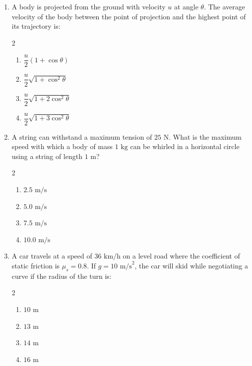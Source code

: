 \documentclass[11pt,a4paper]{article}
\begin{document}
\begin{enumerate}[label=\textbf{\textcolor{l2Amber}{Q\arabic*.}},leftmargin=24pt,itemsep=10pt,start=26]
  \item A body is projected from the ground with velocity $u$ at angle $\theta$. The average velocity of the body between the point of projection and the highest point of its trajectory is:
  \begin{multicols}{2}
  \begin{enumerate}[label=\textbf{\textcolor{primaryDark}{(\Alph*)}},itemsep=2pt]
    \item $\dfrac{u}{2}(1 + \cos\theta)$
    \item $\dfrac{u}{2}\sqrt{1 + \cos^2\theta}$
    \item $\dfrac{u}{2}\sqrt{1 + 2\cos^2\theta}$
    \item $\dfrac{u}{2}\sqrt{1 + 3\cos^2\theta}$
  \end{enumerate}
  \end{multicols}

  \item A string can withstand a maximum tension of $25\text{ N}$. What is the maximum speed with which a body of mass $1\text{ kg}$ can be whirled in a horizontal circle using a string of length $1\text{ m}$?
  \begin{multicols}{2}
  \begin{enumerate}[label=\textbf{\textcolor{primaryDark}{(\Alph*)}},itemsep=2pt]
    \item $2.5\text{ m/s}$
    \item $5.0\text{ m/s}$
    \item $7.5\text{ m/s}$
    \item $10.0\text{ m/s}$
  \end{enumerate}
  \end{multicols}

  \item A car travels at a speed of $36\text{ km/h}$ on a level road where the coefficient of static friction is $\mu_s = 0.8$. If $g = 10\text{ m/s}^2$, the car will skid while negotiating a curve if the radius of the turn is:
  \begin{multicols}{2}
  \begin{enumerate}[label=\textbf{\textcolor{primaryDark}{(\Alph*)}},itemsep=2pt]
    \item $10\text{ m}$
    \item $13\text{ m}$
    \item $14\text{ m}$
    \item $16\text{ m}$
  \end{enumerate}
  \end{multicols}


\end{enumerate}
\end{document}
